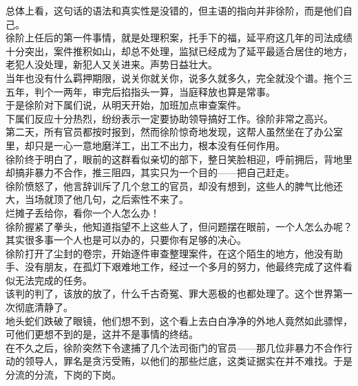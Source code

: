 \begin{multicols}{\theparacolNo}
总体上看，这句话的语法和真实性是没错的，但主语的指向并非徐阶，而是他们自己。\\

徐阶上任后的第一件事情，就是处理积案，托手下的福，延平府这几年的司法成绩十分突出，案件推积如山，却总不处理，监狱已经成为了延平最适合居住的地方，老犯人没处理，新犯人又关进来。声势日益壮大。\\

当年也没有什么羁押期限，说关你就关你，说多久就多久，完全就没个谱。拖个三五年，判个一两年，审完后掐指头一算，当庭释放也算是常事。\\

于是徐阶对下属们说，从明天开始，加班加点审查案件。\\

下属们反应十分热烈，纷纷表示一定要协助领导搞好工作。徐阶非常之高兴。\\

第二天，所有官员都按时报到，然而徐阶惊奇地发现，这帮人虽然坐在了办公室里，却只是一心一意地磨洋工，出工不出力，根本没有任何作用。\\

徐阶终于明白了，眼前的这群看似亲切的部下，整日笑脸相迎，呼前拥后，背地里却搞非暴力不合作，推三阻四，其实只为一个目的——把自己赶走。\\

徐阶愤怒了，他言辞训斥了几个怠工的官员，却没有想到，这些人的脾气比他还大，当场就顶了他几句，之后索性不来了。\\

烂摊子丢给你，看你一个人怎么办！\\

徐阶握紧了拳头，他知道指望不上这些人了，但问题摆在眼前，一个人怎么办呢？\\

其实很多事一个人也是可以办的，只要你有足够的决心。\\

徐阶打开了尘封的卷宗，开始逐件审查整理案件，在这个陌生的地方，他没有助手、没有朋友，在孤灯下艰难地工作，经过一个多月的努力，他最终完成了这件看似无法完成的任务。\\

该判的判了，该放的放了，什么千古奇冤、罪大恶极的也都处理了。这个世界第一次彻底清静了。\\

地头蛇们跌破了眼镜，他们想不到，这个看上去白白净净的外地人竟然如此骠悍，可他们更想不到的是，这并不是事情的终结。\\

在不久之后，徐阶突然下令逮捕了几个法司衙门的官员——那几位非暴力不合作行动的领导人，罪名是贪污受贿，以他们的那些烂底，这类证据实在并不难找。于是分流的分流，下岗的下岗。\\


\end{multicols}
